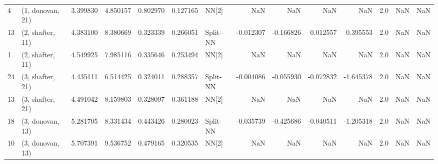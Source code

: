 \begin{tabular}{llrrrrlrrrrrrl}
4  &  (1, donovan, 21) &  3.399830 &   4.850157 &   0.802970 &  0.127165 &       NN[2] &             NaN &           NaN &            NaN &          NaN &            2.0 &    NaN &              NaN \\
13 &  (2, shafter, 11) &  4.383100 &   8.380669 &   0.323339 &  0.266051 &    Split-NN &       -0.012307 &     -0.166826 &       0.012557 &     0.395553 &            2.0 &    NaN &              NaN \\
1  &  (2, shafter, 11) &  4.549925 &   7.985116 &   0.335646 &  0.253494 &       NN[2] &             NaN &           NaN &            NaN &          NaN &            2.0 &    NaN &              NaN \\
24 &  (3, shafter, 21) &  4.435111 &   6.514425 &   0.324011 &  0.288357 &    Split-NN &       -0.004086 &     -0.055930 &      -0.072832 &    -1.645378 &            2.0 &    NaN &              NaN \\
13 &  (3, shafter, 21) &  4.491042 &   8.159803 &   0.328097 &  0.361188 &       NN[2] &             NaN &           NaN &            NaN &          NaN &            2.0 &    NaN &              NaN \\
18 &  (3, donovan, 13) &  5.281705 &   8.331434 &   0.443426 &  0.280023 &    Split-NN &       -0.035739 &     -0.425686 &      -0.040511 &    -1.205318 &            2.0 &    NaN &              NaN \\
10 &  (3, donovan, 13) &  5.707391 &   9.536752 &   0.479165 &  0.320535 &       NN[2] &             NaN &           NaN &            NaN &          NaN &            2.0 &    NaN &              NaN \\
\bottomrule
\end{tabular}
